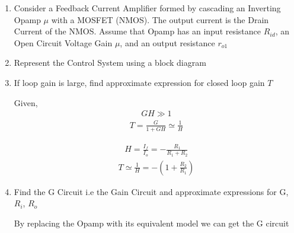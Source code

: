 \begin{enumerate}[label=\thesubsection.\arabic*.,ref=\thesubsection.\theenumi]
\item
Consider a Feedback Current Amplifier formed by cascading an Inverting Opamp $\mu$ with a MOSFET (NMOS).
The output current is the Drain Current of the NMOS.
Assume that Opamp has an input resistance $R_{id}$, an Open Circuit Voltage Gain $\mu$, and an output resistance $r_{o1}$

\begin{figure}[!ht]
	\begin{center}
		
		\resizebox{\columnwidth}{!}{}
	\end{center}
\caption{}
\label{fig:Complete_Circuit}
\end{figure}

\item
Represent the Control System using a block diagram

\solution
\begin{figure}[!ht]
	\begin{center}
			\resizebox{\columnwidth}{!}{}
	\end{center}
\caption{}
\label{fig:Block_Diagram}
\end{figure}

\item
If loop gain is large, find approximate expression for closed loop gain $T$

\solution
Given,
\begin{align}
    GH \gg 1
\end{align}
\begin{align}
    T = \frac{G}{1+GH}\simeq \frac{1}{H}
\end{align}

\begin{align}
    H = \frac{I_{f}}{I_{o}}=-\frac{R_{1}}{R_{1}+R_{2}}
\end{align}
\begin{align}
    T \simeq \frac{1}{H}=-\left(1+\frac{R_{2}}{R_{1}}\right)
\end{align}

\item
Find the G Circuit i.e the Gain Circuit and approximate expressions for G, $R_{i}$, $R_{o}$

\solution
By replacing the Opamp with its equivalent model we can get the G circuit


\end{enumerate}
